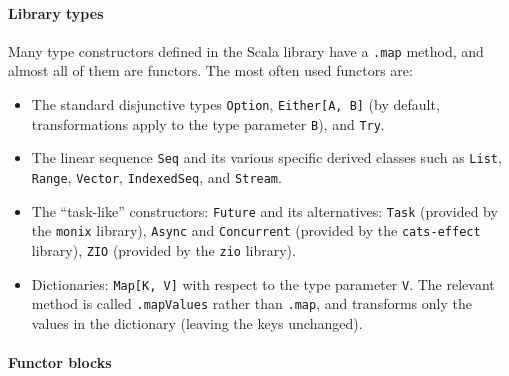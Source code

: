 \paragraph{Library types}

Many type constructors defined in the Scala library have a \lstinline!.map!
method, and almost all of them are functors. The most often used functors
are:
\begin{itemize}
\item The standard disjunctive types \lstinline!Option!, \lstinline!Either[A, B]!
(by default, transformations apply to the type parameter \lstinline!B!),
and \lstinline!Try!.
\item The linear sequence \lstinline!Seq! and its various specific derived
classes such as \lstinline!List!, \lstinline!Range!, \lstinline!Vector!,
\lstinline!IndexedSeq!, and \lstinline!Stream!.
\item The ``task-like'' constructors: \lstinline!Future! and its alternatives:
\lstinline!Task! (provided by the \texttt{monix} library), \lstinline!Async!
and \lstinline!Concurrent! (provided by the \texttt{cats-effect}
library), \lstinline!ZIO! (provided by the \texttt{zio} library).
\item Dictionaries: \lstinline!Map[K, V]! with respect to the type parameter
\lstinline!V!. The relevant method is called \lstinline!.mapValues!
rather than \lstinline!.map!, and transforms only the values in the
dictionary (leaving the keys unchanged).
\end{itemize}

\paragraph{Functor blocks}

